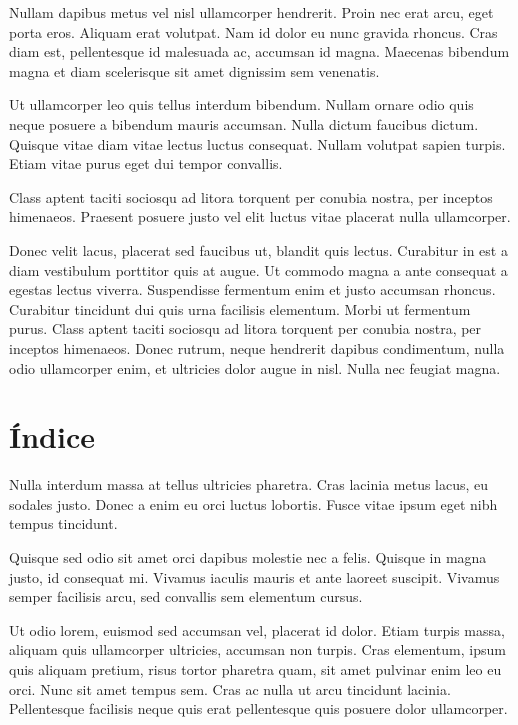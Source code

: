 \documentclass[12pt,a4paper]{report}
\begin{document}
Nullam dapibus metus vel nisl ullamcorper hendrerit. Proin nec erat arcu, eget porta eros. Aliquam erat volutpat. Nam id dolor eu nunc gravida rhoncus. Cras diam est, pellentesque id malesuada ac, accumsan id magna. Maecenas bibendum magna et diam scelerisque sit amet dignissim sem venenatis. 

Ut ullamcorper leo quis tellus interdum bibendum. Nullam ornare odio quis neque posuere a bibendum mauris accumsan. Nulla dictum faucibus dictum. Quisque vitae diam vitae lectus luctus consequat. Nullam volutpat sapien turpis. Etiam vitae purus eget dui tempor convallis. 

Class aptent taciti sociosqu ad litora torquent per conubia nostra, per inceptos himenaeos. Praesent posuere justo vel elit luctus vitae placerat nulla ullamcorper.

Donec velit lacus, placerat sed faucibus ut, blandit quis lectus. Curabitur in est a diam vestibulum porttitor quis at augue. Ut commodo magna a ante consequat a egestas lectus viverra. Suspendisse fermentum enim et justo accumsan rhoncus. Curabitur tincidunt dui quis urna facilisis elementum. Morbi ut fermentum purus. Class aptent taciti sociosqu ad litora torquent per conubia nostra, per inceptos himenaeos. Donec rutrum, neque hendrerit dapibus condimentum, nulla odio ullamcorper enim, et ultricies dolor augue in nisl. Nulla nec feugiat magna. 



\section{Índice}
\label{seccion.indice}



Nulla interdum massa at tellus ultricies pharetra. Cras lacinia metus lacus, eu sodales justo. Donec a enim eu orci luctus lobortis. Fusce vitae ipsum eget nibh tempus tincidunt.

Quisque sed odio sit amet orci dapibus molestie nec a felis. Quisque in magna justo, id consequat mi. Vivamus iaculis mauris et ante laoreet suscipit. Vivamus semper facilisis arcu, sed convallis sem elementum cursus. 

Ut odio lorem, euismod sed accumsan vel, placerat id dolor. Etiam turpis massa, aliquam quis ullamcorper ultricies, accumsan non turpis. Cras elementum, ipsum quis aliquam pretium, risus tortor pharetra quam, sit amet pulvinar enim leo eu orci. Nunc sit amet tempus sem. Cras ac nulla ut arcu tincidunt lacinia. Pellentesque facilisis neque quis erat pellentesque quis posuere dolor ullamcorper. 
\end{document}
